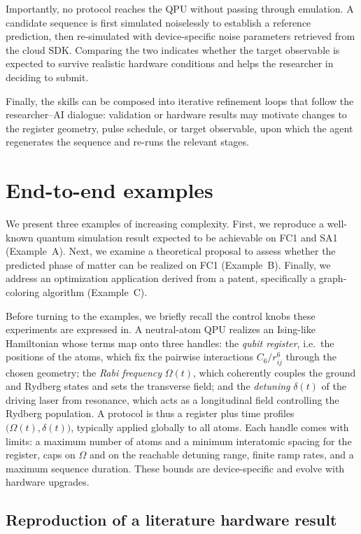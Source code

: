 \documentclass[aps,pra,reprint,amssymb,superscriptaddress,nofootinbib,floatfix]{revtex4-2}
\begin{document}
Importantly, no protocol reaches the QPU without passing through emulation. A candidate sequence is first simulated noiselessly to establish a reference prediction, then re-simulated with device-specific noise parameters retrieved from the cloud SDK. Comparing the two indicates whether the target observable is expected to survive realistic hardware conditions and helps the researcher in deciding to submit.

Finally, the skills can be composed into iterative refinement loops that follow the researcher–AI dialogue: validation or hardware results may motivate changes to the register geometry, pulse schedule, or target observable, upon which the agent regenerates the sequence and re-runs the relevant stages. 


\section{End-to-end examples}\label{sec:ex}

We present three examples of increasing complexity. First, we reproduce a well-known quantum simulation result expected to be achievable on FC1 and SA1 (Example~A). Next, we examine a theoretical proposal to assess whether the predicted phase of matter can be realized on FC1 (Example~B). Finally, we address an optimization application derived from a patent, specifically a graph-coloring algorithm (Example~C).

Before turning to the examples, we briefly recall the control knobs these experiments are expressed in. A neutral-atom QPU realizes an Ising-like Hamiltonian whose terms map onto three handles: the \emph{qubit register}, i.e.\ the positions of the atoms, which fix the pairwise interactions $C_6/r_{ij}^6$ through the chosen geometry; the \emph{Rabi frequency} $\Omega(t)$, which coherently couples the ground and Rydberg states and sets the transverse field; and the \emph{detuning} $\delta(t)$ of the driving laser from resonance, which acts as a longitudinal field controlling the Rydberg population. A protocol is thus a register plus time profiles $\bigl(\Omega(t),\delta(t)\bigr)$, typically applied globally to all atoms.
Each handle comes with limits: a maximum number of atoms and a minimum interatomic spacing for the register, caps on $\Omega$ and on the reachable detuning range, finite ramp rates, and a maximum sequence duration. These bounds are device-specific and evolve with hardware upgrades. 

\subsection{Reproduction of a literature hardware result}\label{sec:ex_keesling}
\end{document}

